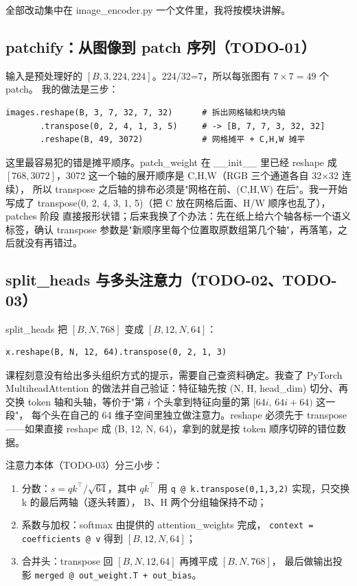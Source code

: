 \documentclass[a4paper,12pt]{article}
\begin{document}
全部改动集中在 image\_encoder.py 一个文件里，我将按模块讲解。

\subsection{patchify：从图像到 patch 序列（TODO-01）}

输入是预处理好的 $[B,3,224,224]$。224/32=7，所以每张图有 $7\times7=49$ 个 patch。
我的做法是三步：

\begin{verbatim}
images.reshape(B, 3, 7, 32, 7, 32)      # 拆出网格轴和块内轴
       .transpose(0, 2, 4, 1, 3, 5)     # -> [B, 7, 7, 3, 32, 32]
       .reshape(B, 49, 3072)            # 网格摊平 + C,H,W 摊平
\end{verbatim}

这里最容易犯的错是摊平顺序。patch\_weight 在 \_\_init\_\_ 里已经 reshape 成
$[768, 3072]$，3072 这一个轴的展开顺序是 C,H,W（RGB 三个通道各自 32$\times$32 连续），
所以 transpose 之后轴的排布必须是"网格在前、(C,H,W) 在后"。我一开始写成了
transpose(0, 2, 4, 3, 1, 5)（把 C 放在网格后面、H/W 顺序也乱了），patches 阶段
直接报形状错；后来我换了个办法：先在纸上给六个轴各标一个语义标签，确认 transpose
参数是"新顺序里每个位置取原数组第几个轴"，再落笔，之后就没有再错过。

\subsection{split\_heads 与多头注意力（TODO-02、TODO-03）}

split\_heads 把 $[B,N,768]$ 变成 $[B,12,N,64]$：

\begin{verbatim}
x.reshape(B, N, 12, 64).transpose(0, 2, 1, 3)
\end{verbatim}

课程刻意没有给出多头组织方式的提示，需要自己查资料确定。我查了 PyTorch
MultiheadAttention 的做法并自己验证：特征轴先按 (N, H, head\_dim) 切分、再交换
token 轴和头轴，等价于"第 $i$ 个头拿到特征向量的第 $[64i,\,64i+64)$ 这一段"，
每个头在自己的 64 维子空间里独立做注意力。reshape 必须先于 transpose——如果直接
reshape 成 (B, 12, N, 64)，拿到的就是按 token 顺序切碎的错位数据。

注意力本体（TODO-03）分三小步：

\begin{enumerate}
    \item 分数：$s = qk^{\top}/\sqrt{64}$，其中 $qk^{\top}$ 用
    \verb|q @ k.transpose(0,1,3,2)| 实现，只交换 k 的最后两轴（逐头转置），
    B、H 两个分组轴保持不动；
    \item 系数与加权：softmax 由提供的 attention\_weights 完成，
    \verb|context = coefficients @ v| 得到 $[B,12,N,64]$；
    \item 合并头：transpose 回 $[B,N,12,64]$ 再摊平成 $[B,N,768]$，
    最后做输出投影 \verb|merged @ out_weight.T + out_bias|。
\end{enumerate}
\end{document}
